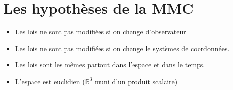 \section{Les hypothèses de la MMC}

\begin{itemize}
    \item Les lois ne sont pas modifiées si on change d'observateur
    \item Les lois ne sont pas modifiées si on change le systèmes de coordonnées.
    \item Les lois sont les mêmes partout dans l'espace et dans le temps.
    \item L'espace est euclidien ($\mathbb{R}^3$ muni d'un produit scalaire)
\end{itemize}



